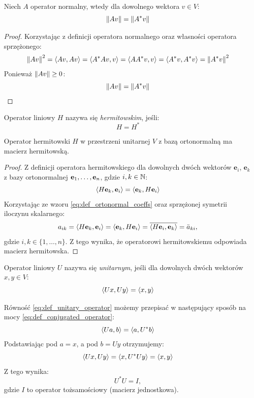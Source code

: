 \begin{theorem}\label{theorem:normal_operator_property}
    Niech $A$ operator normalny, wtedy dla dowolnego wektora $v \in V$:
    $$\left\| Av \right\| = \left\| A^*v \right\|$$
\end{theorem}
\begin{proof}
Korzystając z definicji operatora normalnego oraz własności operatora sprzężonego: 
$$\left\| Av \right\|^2 = \left\langle Av, Av \right\rangle = \left\langle A^*Av, v \right\rangle = \left\langle AA^*v, v \right\rangle = \left\langle A^*v, A^*v \right\rangle = \left\| A^*v \right\|^2$$
Ponieważ $\left\| Av \right\| \ge 0$:
$$\left\| Av \right\| = \left\| A^*v \right\|$$
\end{proof}

\begin{definition}\label{def:h_operator}
Operator liniowy $H$ nazywa się \textit{hermitowskim}, jeśli:
$$H = H^*$$
\end{definition}
\begin{theorem}
    Operator hermitowski $H$ w przestrzeni unitarnej $V$ z bazą ortonormalną ma macierz hermitowską.
\end{theorem}
\begin{proof}
    Z definicji operatora hermitowskiego dla dowolnych dwóch wektorów $\textbf{e}_i$, $\textbf{e}_k$ z bazy ortonormalnej $\mathbf{e}_1, \ldots, \mathbf{e}_n$, gdzie $i, k \in \mathbb{N}$:
    $$\left\langle H\textbf{e}_k, \textbf{e}_i \right\rangle = \left\langle \textbf{e}_k, H\textbf{e}_i \right\rangle$$
    Korzystając ze wzoru \eqref{eq:def_ortonormal_coeffs} oraz sprzężonej symetrii iloczynu skalarnego:
    $$ a_{ik} = \left\langle H\textbf{e}_k, \textbf{e}_i \right\rangle = \left\langle \textbf{e}_k, H\textbf{e}_i \right\rangle = \overline{\left\langle H\textbf{e}_i, \textbf{e}_k \right\rangle} = \bar{a}_{ki}, $$ gdzie $i, k \in \{1, \dots, n\}$. Z tego wynika, że operatorowi hermitowskiemu odpowiada macierz hermitowska.
\end{proof}

\begin{definition}\label{def:unitary_operator}
    Operator liniowy $U$ nazywa się \textit{unitarnym}, jeśli dla dowolnych dwóch wektorów $x, y \in V$:
    \begin{equation}\label{eq:def_unitary_operator}
        \left\langle Ux, Uy \right\rangle = \left\langle x, y \right\rangle
    \end{equation}
\end{definition}
Równość \eqref{eq:def_unitary_operator} możemy przepisać w następujący sposób na mocy \eqref{eq:def_conjugated_operator}:
$$\left\langle Ua, b \right\rangle = \left\langle a, U^*b \right\rangle$$
Podstawiając pod $a = x$, a pod $b = Uy$ otrzymujemy:
$$\left\langle Ux, Uy \right\rangle = \left\langle x, U^*Uy \right\rangle = \left\langle x, y \right\rangle$$
Z tego wynika:
\begin{equation}
    U^*U = I,
\end{equation} gdzie $I$ to operator tożsamościowy (macierz jednostkowa). 

